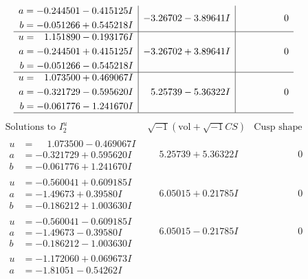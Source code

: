 \documentclass[1p]{elsarticle_modified}
\theoremstyle{definition}
\newcommand{\I}{\sqrt{-1}}
\begin{document}
$$\begin{array}{c|c|c}
\begin{aligned}
a &= -0.244501 - 0.415125 I \\
b &= -0.051266 + 0.545218 I\end{aligned}
 & -3.26702 - 3.89641 I & \phantom{-0.000000 } 0 \\ \hline\begin{aligned}
u &= \phantom{-}1.151890 - 0.193176 I \\
a &= -0.244501 + 0.415125 I \\
b &= -0.051266 - 0.545218 I\end{aligned}
 & -3.26702 + 3.89641 I & \phantom{-0.000000 } 0 \\ \hline\begin{aligned}
u &= \phantom{-}1.073500 + 0.469067 I \\
a &= -0.321729 - 0.595620 I \\
b &= -0.061776 - 1.241670 I\end{aligned}
 & \phantom{-}5.25739 - 5.36322 I & \phantom{-0.000000 } 0\\
 \hline 
 \end{array}$$\newpage$$\begin{array}{c|c|c}  
\text{Solutions to }I^u_{2}& \I (\text{vol} + \sqrt{-1}CS) & \text{Cusp shape}\\
 \hline 
\begin{aligned}
u &= \phantom{-}1.073500 - 0.469067 I \\
a &= -0.321729 + 0.595620 I \\
b &= -0.061776 + 1.241670 I\end{aligned}
 & \phantom{-}5.25739 + 5.36322 I & \phantom{-0.000000 } 0 \\ \hline\begin{aligned}
u &= -0.560041 + 0.609185 I \\
a &= -1.49673 + 0.39580 I \\
b &= -0.186212 + 1.003630 I\end{aligned}
 & \phantom{-}6.05015 + 0.21785 I & \phantom{-0.000000 } 0 \\ \hline\begin{aligned}
u &= -0.560041 - 0.609185 I \\
a &= -1.49673 - 0.39580 I \\
b &= -0.186212 - 1.003630 I\end{aligned}
 & \phantom{-}6.05015 - 0.21785 I & \phantom{-0.000000 } 0 \\ \hline\begin{aligned}
u &= -1.172060 + 0.069673 I \\
a &= -1.81051 - 0.54262 I \\

\end{aligned}
\end{array}$$
\end{document}
